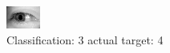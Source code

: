 \begin{figure}[h!]
\begin{center}
\includegraphics[width=0.60\columnwidth]{figures/ID3190_class_3_target_4.png}
\end{center}
\caption{ Classification: 3 actual target: 4}
\label{fig:ID3190_class_3_target_4}
\end{figure}
